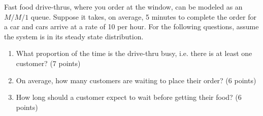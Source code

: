 
\item Fast food drive-thrus, where you order at the window, can be modeled as 
an $M/M/1$ queue. 
Suppose it takes, on average, 5 minutes to complete the order for a car and 
cars arrive at a rate of 10 per hour. 
For the following questions, assume the system is in its steady state 
distribution.

\begin{enumerate}
\item What proportion of the time is the drive-thru busy, i.e. there is at least
one customer? (7 points)

\vfill


\item On average, how many customers are waiting to place their order? (6 points)

\vfill

\item How long should a customer expect to wait before getting their food? 
(6 points)

\vfill

\end{enumerate}
